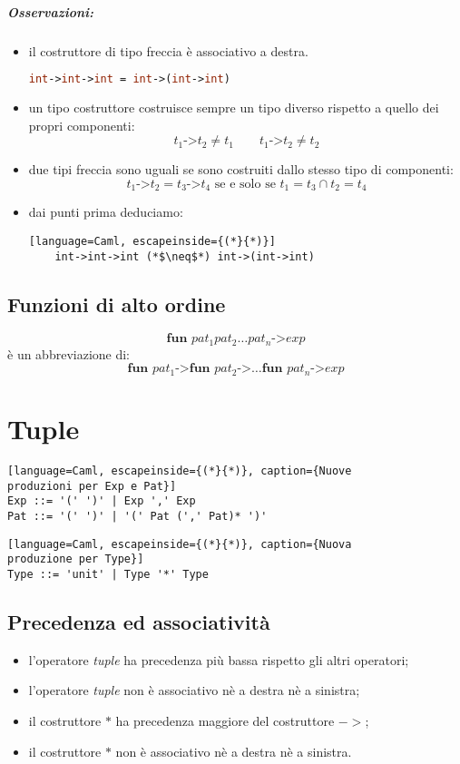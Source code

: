 \subparagraph{Osservazioni:}
\begin{itemize}
  \item il costruttore di tipo freccia è associativo a destra.
    \begin{lstlisting}[language=Caml, caption={Associatività a destra dell'operatore freccia}]
    int->int->int = int->(int->int)
    \end{lstlisting}
  \item un tipo costruttore costruisce sempre un tipo diverso rispetto a quello
    dei propri componenti:
    \[
      t_1 \text{->} t_2 \neq t_1 \qquad t_1 \text{->} t_2 \neq t_2
    \]
  \item due tipi freccia sono uguali se sono costruiti dallo stesso tipo di
    componenti:
    \[
      t_1 \text{->} t_2 = t_3 \text{->} t_4 \text{ se e solo se } t_1 = t_3 \cap t_2 = t_4
    \]
  \item dai punti prima deduciamo:
    \begin{lstlisting}[language=Caml, escapeinside={(*}{*)}]
    int->int->int (*$\neq$*) int->(int->int)
    \end{lstlisting}
\end{itemize}

\subsection{Funzioni di alto ordine}
\[
  \textbf{fun } pat_1 pat_2 \dots pat_n \text{->} exp
\]
è un abbreviazione di:
\[
  \textbf{fun } pat_1 \text{->}\textbf{fun }pat_2 \text{->}\dots \textbf{fun }pat_n \text{->} exp
\]
\section{Tuple}
\begin{lstlisting}[language=Caml, escapeinside={(*}{*)}, caption={Nuove
produzioni per Exp e Pat}]
Exp ::= '(' ')' | Exp ',' Exp
Pat ::= '(' ')' | '(' Pat (',' Pat)* ')'
\end{lstlisting}

\begin{lstlisting}[language=Caml, escapeinside={(*}{*)}, caption={Nuova
produzione per Type}]
Type ::= 'unit' | Type '*' Type
\end{lstlisting}

\subsection{Precedenza ed associatività}
\begin{itemize}
  \item l'operatore \emph{tuple} ha precedenza più bassa rispetto gli altri
    operatori;
  \item l'operatore \emph{tuple} non è associativo nè a destra nè a sinistra;
  \item il costruttore $*$ ha precedenza maggiore del costruttore $->$;
  \item il costruttore $*$ non è associativo nè a destra nè a sinistra.
\end{itemize}

